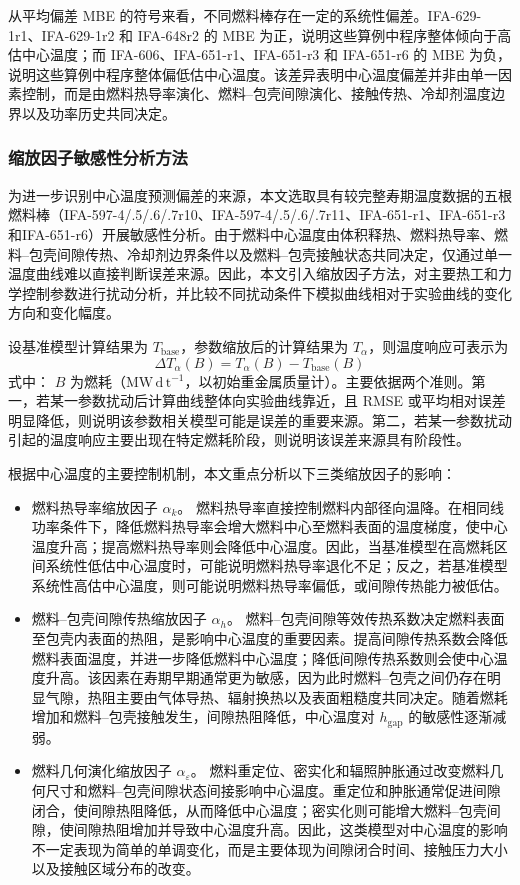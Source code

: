 从平均偏差 MBE 的符号来看，不同燃料棒存在一定的系统性偏差。IFA-629-1r1、IFA-629-1r2 和 IFA-648r2 的 MBE 为正，说明这些算例中程序整体倾向于高估中心温度；而 IFA-606、IFA-651-r1、IFA-651-r3 和 IFA-651-r6 的 MBE 为负，说明这些算例中程序整体偏低估中心温度。该差异表明中心温度偏差并非由单一因素控制，而是由燃料热导率演化、燃料--包壳间隙演化、接触传热、冷却剂温度边界以及功率历史共同决定。

\subsubsection{缩放因子敏感性分析方法}
为进一步识别中心温度预测偏差的来源，本文选取具有较完整寿期温度数据的五根燃料棒（IFA-597-4/.5/.6/.7r10、IFA-597-4/.5/.6/.7r11、IFA-651-r1、IFA-651-r3和IFA-651-r6）开展敏感性分析。由于燃料中心温度由体积释热、燃料热导率、燃料--包壳间隙传热、冷却剂边界条件以及燃料--包壳接触状态共同决定，仅通过单一温度曲线难以直接判断误差来源。因此，本文引入缩放因子方法，对主要热工和力学控制参数进行扰动分析，并比较不同扰动条件下模拟曲线相对于实验曲线的变化方向和变化幅度。

设基准模型计算结果为 \(T_\mathrm{base}\)，参数缩放后的计算结果为 \(T_\alpha\)，则温度响应可表示为
\[
\Delta T_\alpha(B)
=
T_\alpha(B)-T_\mathrm{base}(B)
\]
\noindent 式中： \(B\) 为燃耗（$\mathrm{MW\,d\,t^{-1}}$，以初始重金属质量计）。主要依据两个准则。第一，若某一参数扰动后计算曲线整体向实验曲线靠近，且 RMSE 或平均相对误差明显降低，则说明该参数相关模型可能是误差的重要来源。第二，若某一参数扰动引起的温度响应主要出现在特定燃耗阶段，则说明该误差来源具有阶段性。

根据中心温度的主要控制机制，本文重点分析以下三类缩放因子的影响：

\begin{itemize}
	\item 燃料热导率缩放因子 \(\alpha_k\)。
	燃料热导率直接控制燃料内部径向温降。在相同线功率条件下，降低燃料热导率会增大燃料中心至燃料表面的温度梯度，使中心温度升高；提高燃料热导率则会降低中心温度。因此，当基准模型在高燃耗区间系统性低估中心温度时，可能说明燃料热导率退化不足；反之，若基准模型系统性高估中心温度，则可能说明燃料热导率偏低，或间隙传热能力被低估。
	
	\item 燃料--包壳间隙传热缩放因子 \(\alpha_h\)。
	燃料--包壳间隙等效传热系数决定燃料表面至包壳内表面的热阻，是影响中心温度的重要因素。提高间隙传热系数会降低燃料表面温度，并进一步降低燃料中心温度；降低间隙传热系数则会使中心温度升高。该因素在寿期早期通常更为敏感，因为此时燃料--包壳之间仍存在明显气隙，热阻主要由气体导热、辐射换热以及表面粗糙度共同决定。随着燃耗增加和燃料--包壳接触发生，间隙热阻降低，中心温度对 \(h_\mathrm{gap}\) 的敏感性逐渐减弱。
	
	\item 燃料几何演化缩放因子 \(\alpha_\varepsilon\)。
	燃料重定位、密实化和辐照肿胀通过改变燃料几何尺寸和燃料--包壳间隙状态间接影响中心温度。重定位和肿胀通常促进间隙闭合，使间隙热阻降低，从而降低中心温度；密实化则可能增大燃料--包壳间隙，使间隙热阻增加并导致中心温度升高。因此，这类模型对中心温度的影响不一定表现为简单的单调变化，而是主要体现为间隙闭合时间、接触压力大小以及接触区域分布的改变。
\end{itemize}

